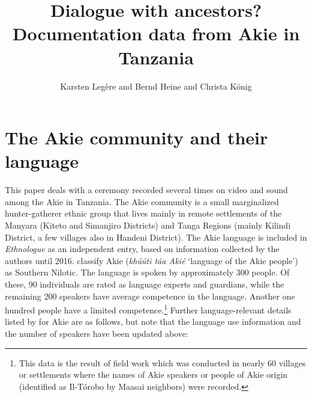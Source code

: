 \documentclass[output=paper,colorlinks,citecolor=brown]{langscibook}
\author{Karsten Legère\affiliation{University of Gothenburg} and Bernd Heine\affiliation{University of Cologne} and  Christa König\affiliation{Goethe University Frankfurt}}
\title{Dialogue with ancestors? Documentation data from Akie in Tanzania}
\begin{document}
\maketitle

\section{The Akie community and their language}\label{sec:legere:1}

This paper deals with a ceremony recorded several times on video and sound among the Akie in Tanzania. The Akie community is a small marginalized hunter-gatherer ethnic group that lives mainly in remote settlements of the Manyara (Kiteto and Simanjiro Districts) and Tanga Regions (mainly Kilindi District, a few villages also in Handeni District). The Akie language is included in \textit{Ethnologue} \citep{SimonsFennig2018}  as an independent entry, based on information collected by the authors until 2016. \citeauthor{SimonsFennig2018} classify Akie (\textit{khúúti táa Akié} `language of the Akie people') as Southern Nilotic. The language is spoken by approximately 300 people. Of these, 90 individuals are rated as language experts and guardians, while the remaining 200 speakers have average competence in the language. Another one hundred people have a limited competence.\footnote{This data is the result of field work which was conducted  in nearly 60 villages or settlements where the names of Akie speakers or people of Akie origin (identified as Il-Tórobo by Maasai neighbors) were recorded.} Further language-relevant details listed by \citeauthor{SimonsFennig2018} for Akie are as follows, but note that the language use information and the number of speakers have been updated above:\largerpage
\end{document}

